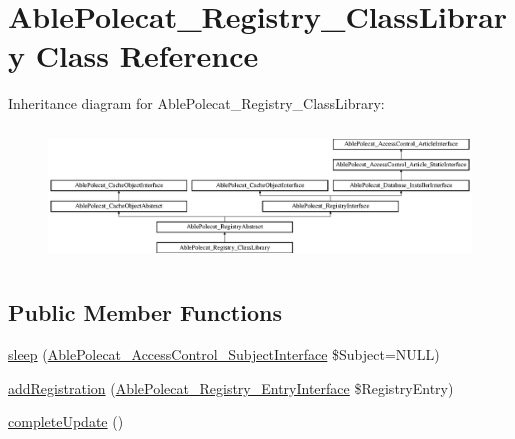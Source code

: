 \hypertarget{class_able_polecat___registry___class_library}{}\section{Able\+Polecat\+\_\+\+Registry\+\_\+\+Class\+Library Class Reference}
\label{class_able_polecat___registry___class_library}
Inheritance diagram for Able\+Polecat\+\_\+\+Registry\+\_\+\+Class\+Library\+:\begin{figure}[H]
\begin{center}
\leavevmode
\includegraphics[height=3.612903cm]{class_able_polecat___registry___class_library}
\end{center}
\end{figure}
\subsection*{Public Member Functions}
\begin{DoxyCompactItemize}
\item 
\hyperlink{class_able_polecat___registry___class_library_a365e24d7b066205cafa2a5cce3a4f224}{sleep} (\hyperlink{interface_able_polecat___access_control___subject_interface}{Able\+Polecat\+\_\+\+Access\+Control\+\_\+\+Subject\+Interface} \$Subject=N\+U\+L\+L)
\item 
\hyperlink{class_able_polecat___registry___class_library_a22d8ddb551ccf544f1d2615db68ca9b1}{add\+Registration} (\hyperlink{interface_able_polecat___registry___entry_interface}{Able\+Polecat\+\_\+\+Registry\+\_\+\+Entry\+Interface} \$Registry\+Entry)
\item 
\hyperlink{class_able_polecat___registry___class_library_a363ee22699ad46520333ef24f64798bb}{complete\+Update} ()
\end{DoxyCompactItemize}
